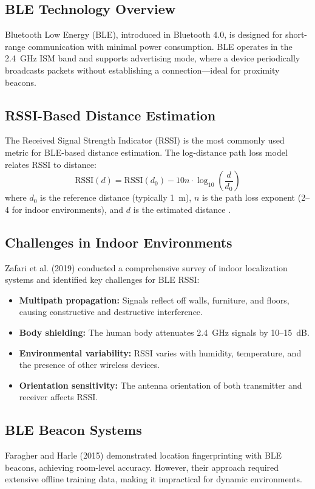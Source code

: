 \documentclass[conference]{IEEEtran}
\begin{document}
\subsection{BLE Technology Overview}
Bluetooth Low Energy (BLE), introduced in Bluetooth 4.0, is designed for short-range communication with minimal power consumption. BLE operates in the 2.4~GHz ISM band and supports advertising mode, where a device periodically broadcasts packets without establishing a connection—ideal for proximity beacons.

\subsection{RSSI-Based Distance Estimation}
The Received Signal Strength Indicator (RSSI) is the most commonly used metric for BLE-based distance estimation. The log-distance path loss model relates RSSI to distance:
\begin{equation}
    \text{RSSI}(d) = \text{RSSI}(d_0) - 10n \cdot \log_{10}\!\left(\frac{d}{d_0}\right)
    \label{eq:pathloss}
\end{equation}
where $d_0$ is the reference distance (typically 1~m), $n$ is the path loss exponent (2--4 for indoor environments), and $d$ is the estimated distance \cite{zafari2019}.

\subsection{Challenges in Indoor Environments}
Zafari et al. (2019) \cite{zafari2019} conducted a comprehensive survey of indoor localization systems and identified key challenges for BLE RSSI:
\begin{itemize}[noitemsep]
    \item \textbf{Multipath propagation:} Signals reflect off walls, furniture, and floors, causing constructive and destructive interference.
    \item \textbf{Body shielding:} The human body attenuates 2.4~GHz signals by 10--15~dB.
    \item \textbf{Environmental variability:} RSSI varies with humidity, temperature, and the presence of other wireless devices.
    \item \textbf{Orientation sensitivity:} The antenna orientation of both transmitter and receiver affects RSSI.
\end{itemize}

\subsection{BLE Beacon Systems}
Faragher and Harle (2015) \cite{faragher2015} demonstrated location fingerprinting with BLE beacons, achieving room-level accuracy. However, their approach required extensive offline training data, making it impractical for dynamic environments.
\end{document}
